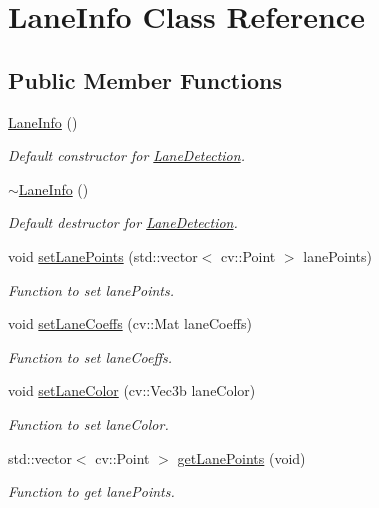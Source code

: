 \hypertarget{classLaneInfo}{}\section{Lane\+Info Class Reference}
\label{classLaneInfo}
\subsection*{Public Member Functions}
\begin{DoxyCompactItemize}
\item 
\hyperlink{classLaneInfo_ae4456324bd7c15c1848d0dd6dea53b4d}{Lane\+Info} ()
\begin{DoxyCompactList}\small\item\em Default constructor for \hyperlink{classLaneDetection}{Lane\+Detection}. \end{DoxyCompactList}\item 
\hyperlink{classLaneInfo_a9dd2b4e25bd67b27c65b54aced06cee4}{$\sim$\+Lane\+Info} ()
\begin{DoxyCompactList}\small\item\em Default destructor for \hyperlink{classLaneDetection}{Lane\+Detection}. \end{DoxyCompactList}\item 
void \hyperlink{classLaneInfo_a39946db06ad80f1b5f1a94f8fe81393e}{set\+Lane\+Points} (std\+::vector$<$ cv\+::\+Point $>$ lane\+Points)
\begin{DoxyCompactList}\small\item\em Function to set lane\+Points. \end{DoxyCompactList}\item 
void \hyperlink{classLaneInfo_a1ae9fe2b711ae9dfbf9f3d167254a844}{set\+Lane\+Coeffs} (cv\+::\+Mat lane\+Coeffs)
\begin{DoxyCompactList}\small\item\em Function to set lane\+Coeffs. \end{DoxyCompactList}\item 
void \hyperlink{classLaneInfo_a1e362dd10c9c25eaa74f45f3eec47fdd}{set\+Lane\+Color} (cv\+::\+Vec3b lane\+Color)
\begin{DoxyCompactList}\small\item\em Function to set lane\+Color. \end{DoxyCompactList}\item 
std\+::vector$<$ cv\+::\+Point $>$ \hyperlink{classLaneInfo_a548666413272e1a4bb09950ba15fb48b}{get\+Lane\+Points} (void)
\begin{DoxyCompactList}\small\item\em Function to get lane\+Points. \end{DoxyCompactList}\item 

\end{DoxyCompactItemize}
